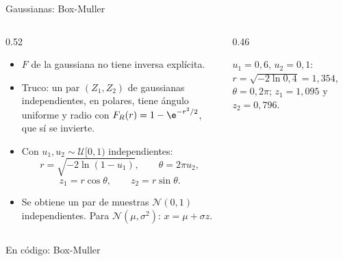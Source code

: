 \documentclass[aspectratio=169,11pt]{beamer}
\begin{document}
\begin{frame}{Gaussianas: Box-Muller}
  \begin{columns}[c]
    \begin{column}{0.52\textwidth}
      \small
      \begin{itemize}
        \item $F$ de la gaussiana no tiene inversa explícita.
        \item Truco: un par $(Z_1,Z_2)$ de gaussianas independientes, en polares, tiene ángulo uniforme y radio con $F_R(r)=1-\e^{-r^2/2}$, que sí se invierte.
        \item Con $u_1,u_2\sim\mathcal U[0,1)$ independientes:
        \[
          r=\sqrt{-2\ln(1-u_1)},\qquad\theta=2\pi u_2,
        \]
        \[
          z_1=r\cos\theta,\qquad z_2=r\sin\theta .
        \]
        \item Se obtiene un \alert{par} de muestras $\mathcal N(0,1)$ independientes. Para $\mathcal N(\mu,\sigma^2)$: $x=\mu+\sigma z$.
      \end{itemize}
    \end{column}
    \begin{column}{0.46\textwidth}
      \begin{ejemplo}
        \footnotesize
        $u_1=0{,}6$, $u_2=0{,}1$: $r=\sqrt{-2\ln0{,}4}=1{,}354$, $\theta=0{,}2\pi$; $z_1=1{,}095$ y $z_2=0{,}796$.
      \end{ejemplo}
    \end{column}
  \end{columns}
\end{frame}

\begin{frame}{En código: Box-Muller}
\end{frame}
\end{document}
